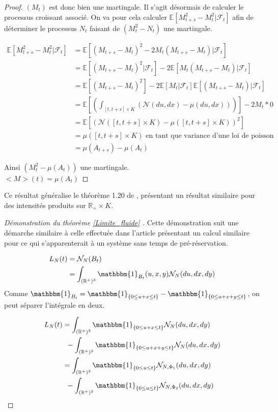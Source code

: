 \documentclass[12pt,a4paper]{article}
\newcommand{\E}[1]{\mathbb{E}\left[ #1 \right]}
\newcommand{\R}{\mathbb{R}}
\newcommand{\1}[1]{\mathbbm{1}_{\{#1\}} }
\theoremstyle{definition}
\begin{document}
{\begin{proof}{}
$(M_t)$ est donc bien une martingale.
Il s'agit désormais de calculer le processus croissant associé. On va pour cela calculer $\E{M_{t+s}^2 - M_t^2|\mathcal{F}_t}$ afin de déterminer le processus $N_t$ faisant de $(M_t^2-N_t)$ une martingale.

\begin{align*}
\E{M_{t+s}^2 - M_t^2|\mathcal{F}_t} &= \E{(M_{t+s} - M_t)^2 - 2 M_t(M_{t+s} - M_t)|\mathcal{F}_t}\\
&= \E{(M_{t+s} - M_t)^2|\mathcal{F}_t} - 2 \E{M_t(M_{t+s} - M_t)|\mathcal{F}_t}\\
&= \E{(M_{t+s} - M_t)^2} - 2 \E{M_t|\mathcal{F}_t} \E{(M_{t+s} - M_t)|\mathcal{F}_t}\\
&= \E{\left(\int_{[t,t+s] \times K} \left(\mathcal{N}(du,dx) - \mu(du,dx)\right)\right)} - 2 M_t*0 \\
&= \E{\left(\mathcal{N}([t,t+s]\times K) - \mu([t,t+s]\times K)\right)^2} \\
&= \mu([t,t+s]\times K) \text{ en tant que variance d'une loi de poisson}\\
&= \mu(A_{t+s}) - \mu(A_{t})
\end{align*}

Ainsi $(M_t^2-\mu(A_{t}))$ une martingale.\\
$<M>(t) = \mu(A_{t})$


\end{proof}
Ce résultat généralise le théorème 1.20 de \cite{robert2013stochastic}, présentant un résultat similaire pour des intensités produits sur $\R_+ \times K$.


\begin{proof}[Démonstration du théorème \ref{Limite_fluide} ]

Cette démonstration suit une démarche similaire à  celle effectuée dans l'article \cite{fricker2007fluid} présentant un calcul similaire pour ce qui s'apparenterait à un système sans temps de pré-réservation.


\begin{align*}
L_N(t) &=  \mathcal{N}_N(B_t)\\
&= \int_{(\R^+)^3} \mathbbm{1}_{B_t}(u,x,y) \mathcal{N}_N(du,dx,dy)
\end{align*}
Comme $\mathbbm{1}_{B_t} = \1{0\leq u+x \leq t} - \1{0\leq u+x+y \leq t}$, on peut séparer l'intégrale en deux.


\begin{align*}
L_N(t) &= \int_{(\R^+)^3} \1{0\leq u+x \leq t} \mathcal{N}_N(du,dx,dy)\\ &\,\,\,-
\int_{(\R^+)^3} \1{0\leq u+x+y \leq t} \mathcal{N}_N(du,dx,dy)\\
&= \int_{(\R^+)^3} \1{0\leq u \leq t} \mathcal{N}_{N,\Phi_1}(du,dx,dy)\\ &\,\,\,-
\int_{(\R^+)^3} \1{0\leq u \leq t} \mathcal{N}_{N,\Phi_2}(du,dx,dy)\\
\end{align*}


\end{proof}}
\end{document}
